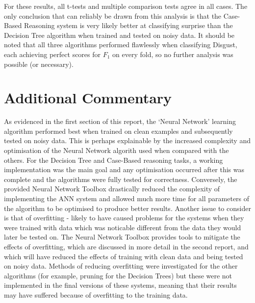 \documentclass[a4paper]{article}
\begin{document}
 For these results, all t-tests and multiple comparison tests agree in all cases. The only conclusion that can reliably be drawn from
 this analysis is that the Case-Based Reasoning system is very likely better at classifying surprise than the Decision Tree algorithm
 when trained and tested on noisy data. It should be noted that all three algorithms performed flawlessly when classifying Disgust,
 each achieving perfect scores for $F_1$ on every fold, so no further analysis was possible (or necessary).\\
 
\section{Additional Commentary}


As evidenced in the first section of this report, the `Neural Network' learning algorithm performed best when trained on clean examples
and subsequently tested on noisy data. This is perhaps explainable by the increased complexity and optimisation of the Neural Network
algorith used when compared with the others. For the Decision Tree and Case-Based reasoning tasks, a working implementation was the main goal
and any optimisation occurred after this was complete and the algorithms were fully tested for correctness. Conversely, the provided Neural
Network Toolbox drastically reduced the complexity of implementing the ANN system and allowed much more time for all parameters of the algorithm
to be optimised to produce better results. Another issue to consider is that of overfitting - likely to have caused problems for the systems when
they were trained with data which was noticable different from the data they would later be tested on. The Neural Network Toolbox provides tools
to mitigate the effects of overfitting, which are discussed in more detail in the second report, and which will have reduced the effects of
training with clean data and being tested on noisy data. Methods of reducing overfitting were investigated for the other algorithms (for example,
pruning for the Decision Trees) but these were not implemented in the final versions of these systems, meaning that their results may have
suffered because of overfitting to the training data.\\

\end{document}
